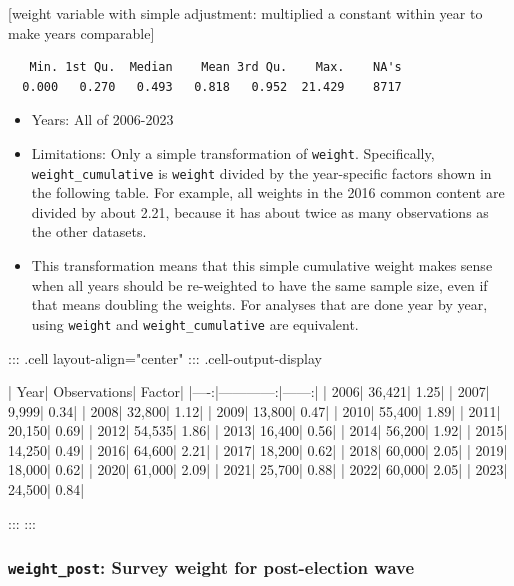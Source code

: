\documentclass[10pt,article,oneside]{memoir}
\theoremstyle{definition}
\begin{document}
{[}weight variable with simple adjustment: multiplied a constant within
year to make years comparable{]}

\begin{verbatim}
   Min. 1st Qu.  Median    Mean 3rd Qu.    Max.    NA's 
  0.000   0.270   0.493   0.818   0.952  21.429    8717 
\end{verbatim}

\begin{itemize}
\tightlist
\item
  Years: All of 2006-2023
\item
  Limitations: Only a simple transformation of \texttt{weight}.
  Specifically, \texttt{weight\_cumulative} is \texttt{weight} divided
  by the year-specific factors shown in the following table. For
  example, all weights in the 2016 common content are divided by about
  2.21, because it has about twice as many observations as the other
  datasets.
\item
  This transformation means that this simple cumulative weight makes
  sense when all years should be re-weighted to have the same sample
  size, even if that means doubling the weights. For analyses that are
  done year by year, using \texttt{weight} and
  \texttt{weight\_cumulative} are equivalent.
\end{itemize}

\begin{center}


::: {.cell layout-align="center"}
::: {.cell-output-display}


| Year| Observations| Factor|
|----:|------------:|------:|
| 2006|       36,421|   1.25|
| 2007|        9,999|   0.34|
| 2008|       32,800|   1.12|
| 2009|       13,800|   0.47|
| 2010|       55,400|   1.89|
| 2011|       20,150|   0.69|
| 2012|       54,535|   1.86|
| 2013|       16,400|   0.56|
| 2014|       56,200|   1.92|
| 2015|       14,250|   0.49|
| 2016|       64,600|   2.21|
| 2017|       18,200|   0.62|
| 2018|       60,000|   2.05|
| 2019|       18,000|   0.62|
| 2020|       61,000|   2.09|
| 2021|       25,700|   0.88|
| 2022|       60,000|   2.05|
| 2023|       24,500|   0.84|


:::
:::

\end{center}

\subsubsection{\texorpdfstring{\texttt{weight\_post}: Survey weight for
post-election
wave}{weight\_post: Survey weight for post-election wave}}\label{weight_post-survey-weight-for-post-election-wave}
\end{document}
